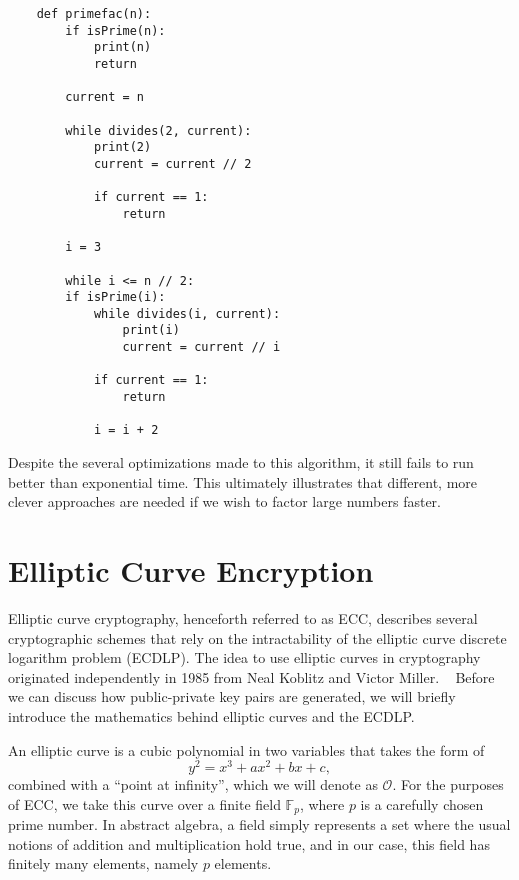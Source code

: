 \documentclass[letterpaper,twocolumn,12pt]{article}
\begin{document}
    \begin{verbatim}
    def primefac(n):
        if isPrime(n):
            print(n)
            return

        current = n

        while divides(2, current):
            print(2)
            current = current // 2

            if current == 1:
                return
        
        i = 3

        while i <= n // 2:
        if isPrime(i):
            while divides(i, current):
                print(i)
                current = current // i

            if current == 1:
                return

            i = i + 2
    \end{verbatim}

    Despite the several optimizations made to this algorithm, it still fails to
    run better than exponential time. This ultimately illustrates that
    different, more clever approaches are needed if we wish to factor large
    numbers faster.

    \section*{Elliptic Curve Encryption}

    Elliptic curve cryptography, henceforth referred to as ECC, describes
    several cryptographic schemes that rely on the intractability of the
    elliptic curve discrete logarithm problem (ECDLP).
    The idea to use elliptic curves in cryptography originated independently
    in 1985 from Neal Koblitz and Victor Miller.
    ~\cite{ECCSource}
    Before we can discuss how public-private key pairs are generated,
    we will briefly introduce
    the mathematics behind elliptic curves and the ECDLP.
    
    An elliptic curve is a cubic polynomial in two variables that takes the
    form of
    \[ y^2 = x^3 + ax^2 + bx + c, \]
    combined with a ``point at infinity'', which we will denote as
    \( \mathcal{O} \).
    For the purposes of ECC, we take this curve over a finite field
    \( \mathbb{F}_p \), where \( p \) is a carefully chosen prime number.
    In abstract algebra, a field simply represents a set where the usual
    notions of addition and multiplication hold true, and in our case, this
    field has finitely many elements, namely \( p \) elements.
\end{document}
